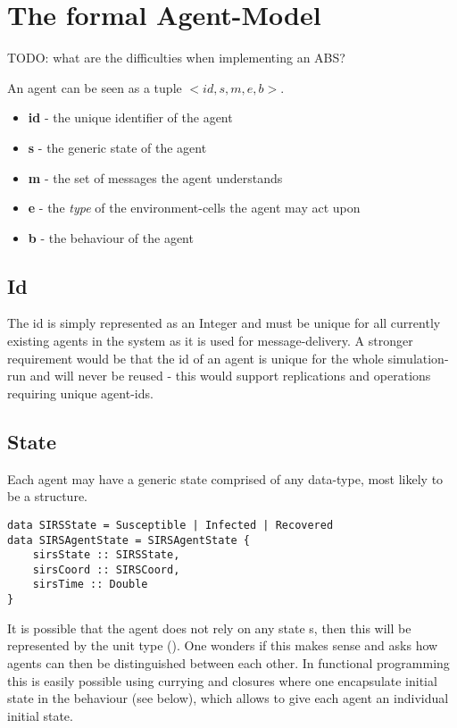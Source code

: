 \section{The formal Agent-Model}
TODO: what are the difficulties when implementing an ABS?


An agent can be seen as a tuple $<id, s, m, e, b>$.
\begin{itemize}
	\item \textbf{id} - the unique identifier of the agent
	\item \textbf{s} - the generic state of the agent
	\item \textbf{m} - the set of messages the agent understands
	\item \textbf{e} - the \textit{type} of the environment-cells the agent may act upon
	\item \textbf{b} - the behaviour of the agent
\end{itemize}

\subsection{Id}
The id is simply represented as an Integer and must be unique for all currently existing agents in the system as it is used for message-delivery. A stronger requirement would be that the id of an agent is unique for the whole simulation-run and will never be reused - this would support replications and operations requiring unique agent-ids.

\subsection{State}
Each agent may have a generic state comprised of any data-type, most likely to be a structure.
\begin{lstlisting}[]
data SIRSState = Susceptible | Infected | Recovered
data SIRSAgentState = SIRSAgentState {
    sirsState :: SIRSState,
    sirsCoord :: SIRSCoord,
    sirsTime :: Double
} 
\end{lstlisting}

It is possible that the agent does not rely on any state s, then this will be represented by the unit type (). One wonders if this makes sense and asks how agents can then be distinguished between each other. In functional programming this is easily possible using currying and closures where one encapsulate initial state in the behaviour (see below), which allows to give each agent an individual initial state.

